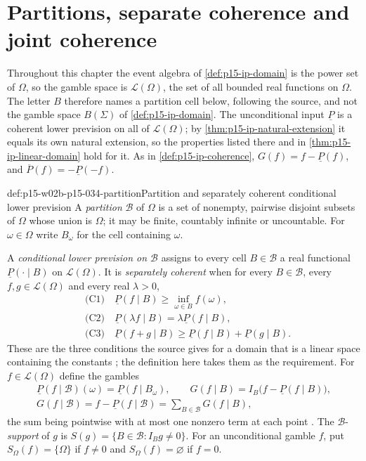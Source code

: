 \section{Partitions, separate coherence and joint coherence}
\label{sec:p15-w02b-p15-034-definitions}

Throughout this chapter the event algebra of \cref{def:p15-ip-domain} is
the power set of \(\Omega\), so the gamble space is
\(\mathcal L(\Omega)\), the set of all bounded real functions on
\(\Omega\). The letter \(B\) therefore names a partition cell below,
following the source, and not the gamble space \(B(\Sigma)\) of
\cref{def:p15-ip-domain}. The unconditional input
\(\underline P\) is a coherent lower prevision on all of
\(\mathcal L(\Omega)\); by \cref{thm:p15-ip-natural-extension} it equals
its own natural extension, so the properties listed there and in
\cref{thm:p15-ip-linear-domain} hold for it. As in
\cref{def:p15-ip-coherence}, \(G(f)=f-\underline P(f)\), and
\(\overline P(f)=-\underline P(-f)\).

\begin{hbdefinition}{def:p15-w02b-p15-034-partition}{Partition and separately coherent conditional lower prevision}
A \emph{partition} \(\mathcal B\) of \(\Omega\) is a set of nonempty,
pairwise disjoint subsets of \(\Omega\) whose union is \(\Omega\); it may
be finite, countably infinite or uncountable. For \(\omega\in\Omega\)
write \(B_\omega\) for the cell containing \(\omega\).

A \emph{conditional lower prevision on \(\mathcal B\)} assigns to every
cell \(B\in\mathcal B\) a real functional
\(\underline P(\cdot\mid B)\) on \(\mathcal L(\Omega)\). It is
\emph{separately coherent} when for every \(B\in\mathcal B\), every
\(f,g\in\mathcal L(\Omega)\) and every real \(\lambda>0\),
\[
\begin{aligned}
 &\text{(C1)}\quad \underline P(f\mid B)\geq\inf_{\omega\in B}f(\omega),\\
 &\text{(C2)}\quad \underline P(\lambda f\mid B)=\lambda\underline P(f\mid B),\\
 &\text{(C3)}\quad \underline P(f+g\mid B)\geq\underline P(f\mid B)+\underline P(g\mid B).
\end{aligned}
\]
These are the three conditions the source gives for a domain that is a
linear space containing the constants \cite[p.~18]{MirandaCoherentLowerPrevisionsCapture};
the definition here takes them as the requirement.
For \(f\in\mathcal L(\Omega)\) define the gambles
\[
\begin{gathered}
 \underline P(f\mid\mathcal B)(\omega)=\underline P(f\mid B_\omega),\qquad
 G(f\mid B)=I_B\bigl(f-\underline P(f\mid B)\bigr),\\
 G(f\mid\mathcal B)=f-\underline P(f\mid\mathcal B)=\sum_{B\in\mathcal B}G(f\mid B),
\end{gathered}
\]
the sum being pointwise with at most one nonzero term at each point
\cite[eq.~(10), p.~18]{MirandaCoherentLowerPrevisionsCapture}.
The \(\mathcal B\)-\emph{support} of \(g\) is
\(S(g)=\{B\in\mathcal B:I_Bg\ne0\}\). For an unconditional gamble
\(f\), put \(S_\Omega(f)=\{\Omega\}\) if \(f\ne0\) and
\(S_\Omega(f)=\varnothing\) if \(f=0\).
\end{hbdefinition}

